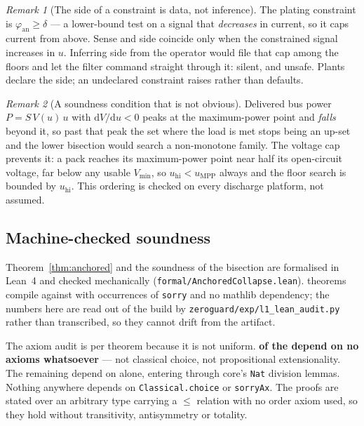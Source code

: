 \documentclass[11pt,letterpaper]{article}
\theoremstyle{definition}
\theoremstyle{remark}
\newtheorem{remark}{Remark}
\begin{document}
\begin{remark}[The side of a constraint is data, not inference]
The plating constraint is $\varphi_{\mathrm{an}} \ge \delta$ --- a lower-bound test on a signal
that \emph{decreases} in current, so it caps current from above. Sense and side coincide only
when the constrained signal increases in $u$. Inferring side from the operator would file that
cap among the floors and let the filter command straight through it: silent, and unsafe. Plants
declare the side; an undeclared constraint raises rather than defaults.
\end{remark}

\begin{remark}[A soundness condition that is not obvious]\label{rem:mpp}
Delivered bus power $P = S\,V(u)\,u$ with $\mathrm{d}V/\mathrm{d}u<0$ peaks at the maximum-power
point and \emph{falls} beyond it, so past that peak the set where the load is met stops being an
up-set and the lower bisection would search a non-monotone family. The voltage cap prevents it:
a pack reaches its maximum-power point near half its open-circuit voltage, far below any usable
$V_{\min}$, so $u_{\mathrm{hi}} < u_{\mathrm{MPP}}$ always and the floor search is bounded by
$u_{\mathrm{hi}}$. This ordering is checked on every discharge platform, not assumed.
\end{remark}

\subsection{Machine-checked soundness}\label{sec:formal}

Theorem~\ref{thm:anchored} and the soundness of the bisection are formalised in Lean~4 and
checked mechanically (\texttt{formal/AnchoredCollapse.lean}). \leanThms{} theorems compile
against \texttt{\leanToolchain} with \leanSorry{} occurrences of \texttt{sorry} and no mathlib
dependency; the numbers here are read out of the build by
\texttt{zeroguard/exp/l1\_lean\_audit.py} rather than transcribed, so they cannot drift from the
artifact.

The axiom audit is per theorem because it is not uniform. \textbf{\leanFreeWord{} of the
\leanThms{} depend on no axioms whatsoever} --- not classical choice, not propositional
extensionality. The remaining \leanUsing{} depend on \leanAxioms{} alone, entering through core's
\texttt{Nat} division lemmas. Nothing anywhere depends on \texttt{Classical.choice} or
\texttt{sorryAx}. The proofs are stated over an arbitrary type carrying a $\le$ relation with no
order axiom used, so they hold without transitivity, antisymmetry or totality.
\end{document}
